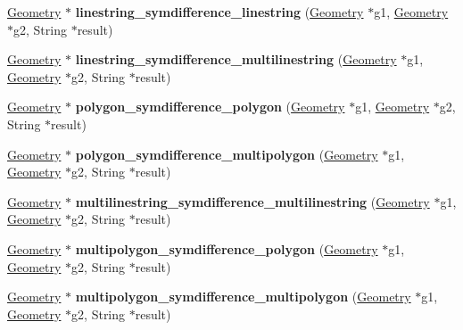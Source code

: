 \begin{DoxyCompactItemize}
\mbox{\label{classBG__setop__wrapper_afe2d088da61012117eb7ad4ae3a6afc8}} 
\mbox{\hyperlink{classGeometry}{Geometry}} $\ast$ {\bfseries linestring\+\_\+symdifference\+\_\+linestring} (\mbox{\hyperlink{classGeometry}{Geometry}} $\ast$g1, \mbox{\hyperlink{classGeometry}{Geometry}} $\ast$g2, String $\ast$result)
\item 
\mbox{\label{classBG__setop__wrapper_a4c49d10dd6ebc5a851ed86f9e7b044df}} 
\mbox{\hyperlink{classGeometry}{Geometry}} $\ast$ {\bfseries linestring\+\_\+symdifference\+\_\+multilinestring} (\mbox{\hyperlink{classGeometry}{Geometry}} $\ast$g1, \mbox{\hyperlink{classGeometry}{Geometry}} $\ast$g2, String $\ast$result)
\item 
\mbox{\label{classBG__setop__wrapper_a69cfcea90ded64e42183048df52d694b}} 
\mbox{\hyperlink{classGeometry}{Geometry}} $\ast$ {\bfseries polygon\+\_\+symdifference\+\_\+polygon} (\mbox{\hyperlink{classGeometry}{Geometry}} $\ast$g1, \mbox{\hyperlink{classGeometry}{Geometry}} $\ast$g2, String $\ast$result)
\item 
\mbox{\label{classBG__setop__wrapper_a6eabde5becdb2ecd586a127fb4b128f5}} 
\mbox{\hyperlink{classGeometry}{Geometry}} $\ast$ {\bfseries polygon\+\_\+symdifference\+\_\+multipolygon} (\mbox{\hyperlink{classGeometry}{Geometry}} $\ast$g1, \mbox{\hyperlink{classGeometry}{Geometry}} $\ast$g2, String $\ast$result)
\item 
\mbox{\label{classBG__setop__wrapper_a7c94103350bdc9c71a48b7fe97c2c5b4}} 
\mbox{\hyperlink{classGeometry}{Geometry}} $\ast$ {\bfseries multilinestring\+\_\+symdifference\+\_\+multilinestring} (\mbox{\hyperlink{classGeometry}{Geometry}} $\ast$g1, \mbox{\hyperlink{classGeometry}{Geometry}} $\ast$g2, String $\ast$result)
\item 
\mbox{\label{classBG__setop__wrapper_ab9986eee55ed6246ffb356fda6f28dc6}} 
\mbox{\hyperlink{classGeometry}{Geometry}} $\ast$ {\bfseries multipolygon\+\_\+symdifference\+\_\+polygon} (\mbox{\hyperlink{classGeometry}{Geometry}} $\ast$g1, \mbox{\hyperlink{classGeometry}{Geometry}} $\ast$g2, String $\ast$result)
\item 
\mbox{\label{classBG__setop__wrapper_af93ec0a28364720855462e87b20a8d4c}} 
\mbox{\hyperlink{classGeometry}{Geometry}} $\ast$ {\bfseries multipolygon\+\_\+symdifference\+\_\+multipolygon} (\mbox{\hyperlink{classGeometry}{Geometry}} $\ast$g1, \mbox{\hyperlink{classGeometry}{Geometry}} $\ast$g2, String $\ast$result)
\end{DoxyCompactItemize}


